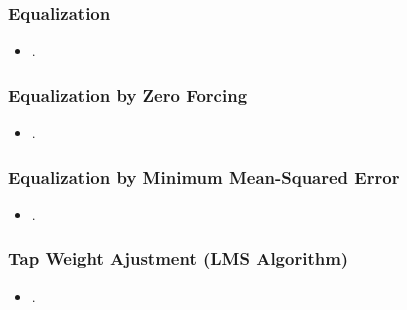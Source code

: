 \documentclass{beamer}
\begin{document}
\begin{frame}
	\frametitle{Equalization}
	\begin{itemize}
		\item .
	\end{itemize}
\end{frame}

\begin{frame}
	\frametitle{Equalization by Zero Forcing}
	\begin{itemize}
		\item .
	\end{itemize}
\end{frame}

\begin{frame}
	\frametitle{Equalization by Minimum Mean-Squared Error}
	\begin{itemize}
		\item .
	\end{itemize}
\end{frame}

\begin{frame}
	\frametitle{Tap Weight Ajustment (LMS Algorithm)}
	\begin{itemize}
		\item .
	\end{itemize}
\end{frame}
\end{document}
